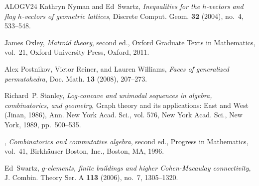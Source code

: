 \documentclass[11pt]{amsart}
\theoremstyle{theorems}
\theoremstyle{definition}
\begin{document}
\begin{thebibliography}{ALOGV24}
Kathryn Nyman and Ed~Swartz, \emph{Inequalities for the {$h$}-vectors and flag {$h$}-vectors of geometric lattices}, Discrete Comput. Geom. \textbf{32} (2004), no.~4, 533--548. 

James Oxley, \emph{Matroid theory}, second ed., Oxford Graduate Texts in Mathematics, vol.~21, Oxford University Press, Oxford, 2011. 

Alex Postnikov, Victor Reiner, and Lauren Williams, \emph{Faces of generalized permutohedra}, Doc. Math. \textbf{13} (2008), 207--273. 

Richard~P. Stanley, \emph{Log-concave and unimodal sequences in algebra, combinatorics, and geometry}, Graph theory and its applications: {E}ast and {W}est ({J}inan, 1986), Ann. New York Acad. Sci., vol. 576, New York Acad. Sci., New York, 1989, pp.~500--535. 

\bysame, \emph{Combinatorics and commutative algebra}, second ed., Progress in Mathematics, vol.~41, Birkh\"auser Boston, Inc., Boston, MA, 1996. 

Ed~Swartz, \emph{{$g$}-elements, finite buildings and higher {C}ohen-{M}acaulay connectivity}, J. Combin. Theory Ser. A \textbf{113} (2006), no.~7, 1305--1320. 

\end{thebibliography}
\end{document}

